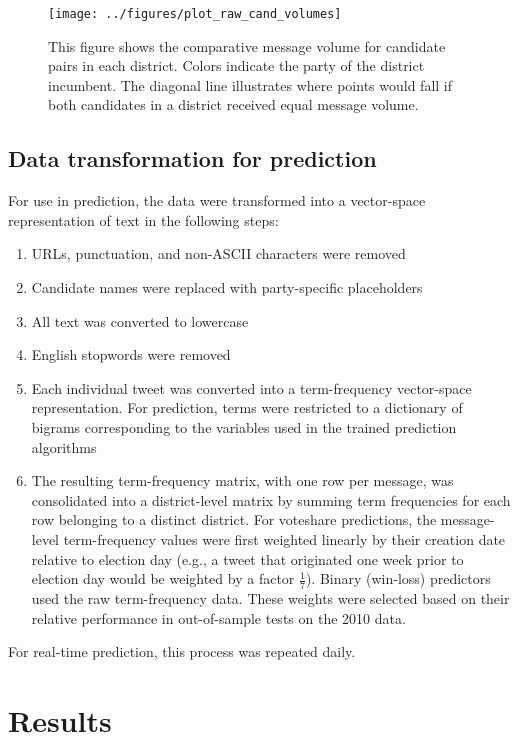 \documentclass[11pt]{article}
\begin{document}
\begin{figure}[ht]
  \centering
  \texttt{[image: ../figures/plot\_raw\_cand\_volumes]}
  \caption{This figure shows the comparative message volume for
    candidate pairs in each district. Colors indicate the party of the
    district incumbent. The diagonal line illustrates where points would fall if both candidates in a district received equal message volume.}
  \label{fig:cand-msg-volume}
\end{figure}

\subsection{Data transformation for prediction}
\label{sec:data-transf-pred}

For use in prediction, the data were transformed into a vector-space
representation of text in the following steps:
\begin{enumerate}
\item URLs, punctuation, and non-ASCII characters were removed
\item Candidate names were replaced with party-specific placeholders
\item All text was converted to lowercase
\item English stopwords were removed
\item Each individual tweet was converted into a term-frequency
  vector-space representation. For prediction, terms were restricted
  to a dictionary of bigrams corresponding to the variables used in
  the trained prediction algorithms
\item The resulting term-frequency matrix, with one row per message,
  was consolidated into a district-level matrix by summing term
  frequencies for each row belonging to a distinct district. For
  voteshare predictions, the message-level term-frequency values were
  first weighted linearly by their creation date relative to election
  day (e.g., a tweet that originated one week prior to election day
  would be weighted by a factor $\frac{1}{7}$). Binary (win-loss)
  predictors used the raw term-frequency data. These weights were
  selected based on their relative performance in out-of-sample tests
  on the 2010 data. 
\end{enumerate}

For real-time prediction, this process was repeated daily. 


\section{Results}
\label{sec:results}
\end{document}
